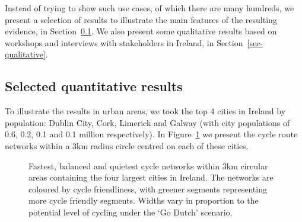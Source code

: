 \documentclass[
  super,
  preprint,
  3p]{elsarticle}
\begin{document}
Instead of trying to show such use cases, of which there are many
hundreds, we present a selection of results to illustrate the main
features of the resulting evidence, in Section~\ref{sec-quantiative}. We
also present some qualitative results based on workshops and interviews
with stakeholders in Ireland, in Section~\ref{sec-qualitative}.

\subsection{Selected quantitative results}\label{sec-quantiative}

To illustrate the results in urban areas, we took the top 4 cities in
Ireland by population: Dublin City, Cork, Limerick and Galway (with city
populations of 0.6, 0.2, 0.1 and 0.1 million respectively). In
Figure~\ref{fig-city-results} we present the cycle route networks within
a 3km radius circle centred on each of these cities.

\begin{figure}


\caption{\label{fig-city-results}Fastest, balanced and quietest cycle
networks within 3km circular areas containing the four largest cities in
Ireland. The networks are coloured by cycle friendliness, with greener
segments representing more cycle friendly segments. Widths vary in
proportion to the potential level of cycling under the `Go Dutch'
scenario.}

\end{figure}%
\end{document}
